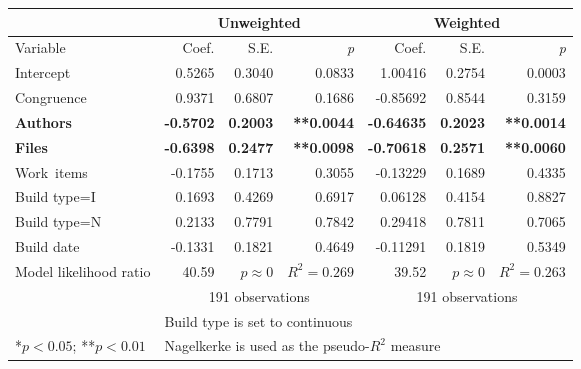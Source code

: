 
\begin{tabular}{l|rrr|rrr}
 & \multicolumn{3}{c|}{Unweighted} & \multicolumn{3}{c}{Weighted} \\\hline
Variable & Coef. & S.E. & \emph{p} & Coef. & S.E. & \emph{p} \\
	\hline                                                                
	Intercept                &  0.5265 & 0.3040 & 0.0833 &  1.00416 & 0.2754 & 0.0003 \\
	Congruence               &  0.9371 & 0.6807 & 0.1686 & -0.85692 & 0.8544 & 0.3159 \\
	\textbf{Authors}         & \textbf{-0.5702} & \textbf{0.2003} & \textbf{**0.0044} & \textbf{-0.64635} & \textbf{0.2023} & \textbf{**0.0014} \\
	\textbf{Files}           & \textbf{-0.6398} & \textbf{0.2477} & \textbf{**0.0098} & \textbf{-0.70618} & \textbf{0.2571} & \textbf{**0.0060} \\
	Work~items                & -0.1755 & 0.1713 & 0.3055 & -0.13229 & 0.1689 & 0.4335 \\
	Build type=I                   &  0.1693 & 0.4269 & 0.6917 &  0.06128 & 0.4154 & 0.8827 \\
	Build type=N                   &  0.2133 & 0.7791 & 0.7842 &  0.29418 & 0.7811 & 0.7065 \\
	Build date               & -0.1331 & 0.1821 & 0.4649 & -0.11291 & 0.1819 & 0.5349 \\
	\hline
Model likelihood ratio & 40.59 & $p \approx 0$ & $R^2=0.269$ & 39.52 & $p \approx 0$ &	$R^2 = 0.263$ \\
& \multicolumn{3}{c}{191 observations} & \multicolumn{3}{c}{191 observations} \\
\multicolumn{1}{l}{ } & \multicolumn{6}{l}{\scriptsize{Build type is set to continuous}} \\
\multicolumn{1}{l}{\scriptsize{*$p < 0.05$; **$p < 0.01$}} & \multicolumn{6}{l}{\scriptsize{Nagelkerke is used as the pseudo-$R^2$ measure}}
\end{tabular}

